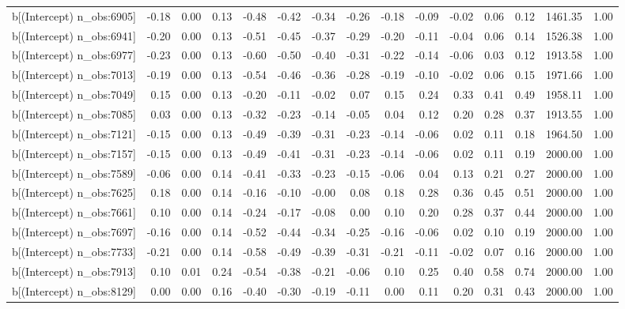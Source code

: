 \begin{table}[ht]
\begin{tabular}{rrrrrrrrrrrrrrr}
  b[(Intercept) n\_obs:6905] & -0.18 & 0.00 & 0.13 & -0.48 & -0.42 & -0.34 & -0.26 & -0.18 & -0.09 & -0.02 & 0.06 & 0.12 & 1461.35 & 1.00 \\ 
  b[(Intercept) n\_obs:6941] & -0.20 & 0.00 & 0.13 & -0.51 & -0.45 & -0.37 & -0.29 & -0.20 & -0.11 & -0.04 & 0.06 & 0.14 & 1526.38 & 1.00 \\ 
  b[(Intercept) n\_obs:6977] & -0.23 & 0.00 & 0.13 & -0.60 & -0.50 & -0.40 & -0.31 & -0.22 & -0.14 & -0.06 & 0.03 & 0.12 & 1913.58 & 1.00 \\ 
  b[(Intercept) n\_obs:7013] & -0.19 & 0.00 & 0.13 & -0.54 & -0.46 & -0.36 & -0.28 & -0.19 & -0.10 & -0.02 & 0.06 & 0.15 & 1971.66 & 1.00 \\ 
  b[(Intercept) n\_obs:7049] & 0.15 & 0.00 & 0.13 & -0.20 & -0.11 & -0.02 & 0.07 & 0.15 & 0.24 & 0.33 & 0.41 & 0.49 & 1958.11 & 1.00 \\ 
  b[(Intercept) n\_obs:7085] & 0.03 & 0.00 & 0.13 & -0.32 & -0.23 & -0.14 & -0.05 & 0.04 & 0.12 & 0.20 & 0.28 & 0.37 & 1913.55 & 1.00 \\ 
  b[(Intercept) n\_obs:7121] & -0.15 & 0.00 & 0.13 & -0.49 & -0.39 & -0.31 & -0.23 & -0.14 & -0.06 & 0.02 & 0.11 & 0.18 & 1964.50 & 1.00 \\ 
  b[(Intercept) n\_obs:7157] & -0.15 & 0.00 & 0.13 & -0.49 & -0.41 & -0.31 & -0.23 & -0.14 & -0.06 & 0.02 & 0.11 & 0.19 & 2000.00 & 1.00 \\ 
  b[(Intercept) n\_obs:7589] & -0.06 & 0.00 & 0.14 & -0.41 & -0.33 & -0.23 & -0.15 & -0.06 & 0.04 & 0.13 & 0.21 & 0.27 & 2000.00 & 1.00 \\ 
  b[(Intercept) n\_obs:7625] & 0.18 & 0.00 & 0.14 & -0.16 & -0.10 & -0.00 & 0.08 & 0.18 & 0.28 & 0.36 & 0.45 & 0.51 & 2000.00 & 1.00 \\ 
  b[(Intercept) n\_obs:7661] & 0.10 & 0.00 & 0.14 & -0.24 & -0.17 & -0.08 & 0.00 & 0.10 & 0.20 & 0.28 & 0.37 & 0.44 & 2000.00 & 1.00 \\ 
  b[(Intercept) n\_obs:7697] & -0.16 & 0.00 & 0.14 & -0.52 & -0.44 & -0.34 & -0.25 & -0.16 & -0.06 & 0.02 & 0.10 & 0.19 & 2000.00 & 1.00 \\ 
  b[(Intercept) n\_obs:7733] & -0.21 & 0.00 & 0.14 & -0.58 & -0.49 & -0.39 & -0.31 & -0.21 & -0.11 & -0.02 & 0.07 & 0.16 & 2000.00 & 1.00 \\ 
  b[(Intercept) n\_obs:7913] & 0.10 & 0.01 & 0.24 & -0.54 & -0.38 & -0.21 & -0.06 & 0.10 & 0.25 & 0.40 & 0.58 & 0.74 & 2000.00 & 1.00 \\ 
  b[(Intercept) n\_obs:8129] & 0.00 & 0.00 & 0.16 & -0.40 & -0.30 & -0.19 & -0.11 & 0.00 & 0.11 & 0.20 & 0.31 & 0.43 & 2000.00 & 1.00 \\ 

\end{tabular}
\end{table}
